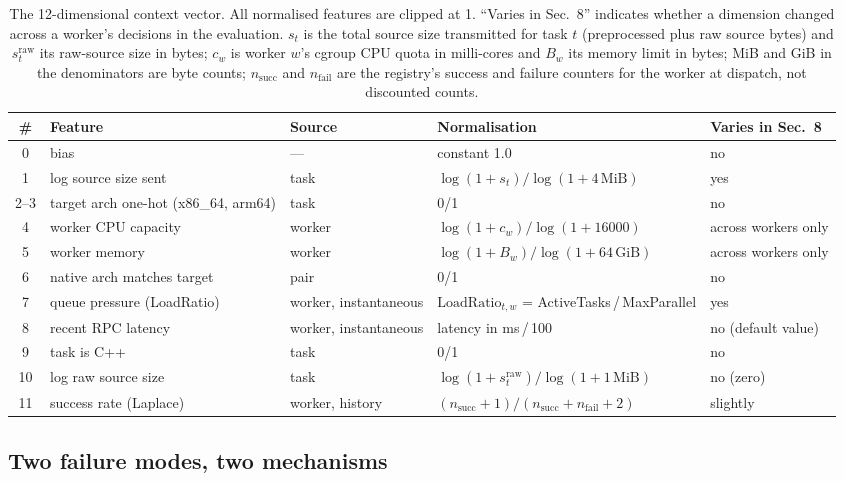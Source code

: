 \documentclass[final,5p,times,twocolumn]{elsarticle}
\begin{document}
\begin{table}[t]
\centering
\caption{The 12-dimensional context vector. All normalised features are clipped at 1. ``Varies in Sec.~8'' indicates whether a dimension changed across a worker's decisions in the evaluation. $s_t$ is the total source size transmitted for task $t$ (preprocessed plus raw source bytes) and $s^{\text{raw}}_t$ its raw-source size in bytes; $c_w$ is worker $w$'s cgroup CPU quota in milli-cores and $B_w$ its memory limit in bytes; MiB and GiB in the denominators are byte counts; $n_{\text{succ}}$ and $n_{\text{fail}}$ are the registry's success and failure counters for the worker at dispatch, not discounted counts.}
\label{tab:features}
\footnotesize
\begin{tabular}{cllll}
\toprule
\# & Feature & Source & Normalisation & Varies in Sec.~8 \\
\midrule
0 & bias & --- & constant 1.0 & no \\
1 & log source size sent & task & $\log(1+s_t)/\log(1+4\,\text{MiB})$ & yes \\
2--3 & target arch one-hot (x86\_64, arm64) & task & 0/1 & no \\
4 & worker CPU capacity & worker & $\log(1+c_w)/\log(1+16000)$ & across workers only \\
5 & worker memory & worker & $\log(1+B_w)/\log(1+64\,\text{GiB})$ & across workers only \\
6 & native arch matches target & pair & 0/1 & no \\
7 & queue pressure (LoadRatio) & worker, instantaneous & $\text{LoadRatio}_{t,w}$ = ActiveTasks\,/\,MaxParallel & yes \\
8 & recent RPC latency & worker, instantaneous & latency in ms\,/\,100 & no (default value) \\
9 & task is C++ & task & 0/1 & no \\
10 & log raw source size & task & $\log(1+s^{\text{raw}}_t)/\log(1+1\,\text{MiB})$ & no (zero) \\
11 & success rate (Laplace) & worker, history & $(n_{\text{succ}}+1)/(n_{\text{succ}}+n_{\text{fail}}+2)$ & slightly \\
\bottomrule
\end{tabular}
\end{table}

\subsection{Two failure modes, two mechanisms}
\label{sec:mechanisms}
\end{document}

